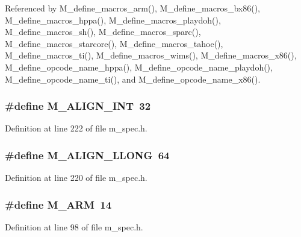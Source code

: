 Referenced by M\_\-define\_\-macros\_\-arm(), M\_\-define\_\-macros\_\-bx86(), M\_\-define\_\-macros\_\-hppa(), M\_\-define\_\-macros\_\-playdoh(), M\_\-define\_\-macros\_\-sh(), M\_\-define\_\-macros\_\-sparc(), M\_\-define\_\-macros\_\-starcore(), M\_\-define\_\-macros\_\-tahoe(), M\_\-define\_\-macros\_\-ti(), M\_\-define\_\-macros\_\-wims(), M\_\-define\_\-macros\_\-x86(), M\_\-define\_\-opcode\_\-name\_\-hppa(), M\_\-define\_\-opcode\_\-name\_\-playdoh(), M\_\-define\_\-opcode\_\-name\_\-ti(), and M\_\-define\_\-opcode\_\-name\_\-x86().
\subsubsection{\setlength{\rightskip}{0pt plus 5cm}\#define M\_\-ALIGN\_\-INT~32}\label{m__spec_8h_ef683e2cfb5217882ecd38d62b03aa3a}




Definition at line 222 of file m\_\-spec.h.
\subsubsection{\setlength{\rightskip}{0pt plus 5cm}\#define M\_\-ALIGN\_\-LLONG~64}\label{m__spec_8h_a90a7ba501105c0d3f646b995c4fcdc9}




Definition at line 220 of file m\_\-spec.h.
\subsubsection{\setlength{\rightskip}{0pt plus 5cm}\#define M\_\-ARM~14}\label{m__spec_8h_49eaaafe7d80f0846734a15e249b3183}




Definition at line 98 of file m\_\-spec.h.

